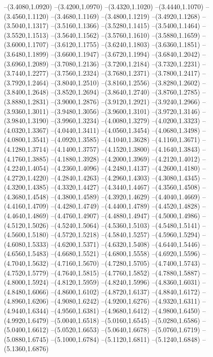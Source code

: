 {\begin{scope}
--(3.4080,1.0920)
--(3.4200,1.0970)
--(3.4320,1.1020)
--(3.4440,1.1070)
--(3.4560,1.1120)
--(3.4680,1.1169)
--(3.4800,1.1219)
--(3.4920,1.1268)
--(3.5040,1.1317)
--(3.5160,1.1366)
--(3.5280,1.1415)
--(3.5400,1.1464)
--(3.5520,1.1513)
--(3.5640,1.1562)
--(3.5760,1.1610)
--(3.5880,1.1659)
--(3.6000,1.1707)
--(3.6120,1.1755)
--(3.6240,1.1803)
--(3.6360,1.1851)
--(3.6480,1.1899)
--(3.6600,1.1947)
--(3.6720,1.1994)
--(3.6840,1.2042)
--(3.6960,1.2089)
--(3.7080,1.2136)
--(3.7200,1.2184)
--(3.7320,1.2231)
--(3.7440,1.2277)
--(3.7560,1.2324)
--(3.7680,1.2371)
--(3.7800,1.2417)
--(3.7920,1.2464)
--(3.8040,1.2510)
--(3.8160,1.2556)
--(3.8280,1.2602)
--(3.8400,1.2648)
--(3.8520,1.2694)
--(3.8640,1.2740)
--(3.8760,1.2785)
--(3.8880,1.2831)
--(3.9000,1.2876)
--(3.9120,1.2921)
--(3.9240,1.2966)
--(3.9360,1.3011)
--(3.9480,1.3056)
--(3.9600,1.3101)
--(3.9720,1.3146)
--(3.9840,1.3190)
--(3.9960,1.3234)
--(4.0080,1.3279)
--(4.0200,1.3323)
--(4.0320,1.3367)
--(4.0440,1.3411)
--(4.0560,1.3454)
--(4.0680,1.3498)
--(4.0800,1.3541)
--(4.0920,1.3585)
--(4.1040,1.3628)
--(4.1160,1.3671)
--(4.1280,1.3714)
--(4.1400,1.3757)
--(4.1520,1.3800)
--(4.1640,1.3843)
--(4.1760,1.3885)
--(4.1880,1.3928)
--(4.2000,1.3969)
--(4.2120,1.4012)
--(4.2240,1.4054)
--(4.2360,1.4096)
--(4.2480,1.4137)
--(4.2600,1.4180)
--(4.2720,1.4220)
--(4.2840,1.4263)
--(4.2960,1.4303)
--(4.3080,1.4345)
--(4.3200,1.4385)
--(4.3320,1.4427)
--(4.3440,1.4467)
--(4.3560,1.4508)
--(4.3680,1.4548)
--(4.3800,1.4589)
--(4.3920,1.4629)
--(4.4040,1.4669)
--(4.4160,1.4709)
--(4.4280,1.4749)
--(4.4400,1.4789)
--(4.4520,1.4828)
--(4.4640,1.4869)
--(4.4760,1.4907)
--(4.4880,1.4947)
--(4.5000,1.4986)
--(4.5120,1.5026)
--(4.5240,1.5064)
--(4.5360,1.5103)
--(4.5480,1.5141)
--(4.5600,1.5180)
--(4.5720,1.5218)
--(4.5840,1.5257)
--(4.5960,1.5294)
--(4.6080,1.5333)
--(4.6200,1.5371)
--(4.6320,1.5408)
--(4.6440,1.5446)
--(4.6560,1.5483)
--(4.6680,1.5521)
--(4.6800,1.5558)
--(4.6920,1.5596)
--(4.7040,1.5632)
--(4.7160,1.5670)
--(4.7280,1.5705)
--(4.7400,1.5743)
--(4.7520,1.5779)
--(4.7640,1.5815)
--(4.7760,1.5852)
--(4.7880,1.5887)
--(4.8000,1.5924)
--(4.8120,1.5959)
--(4.8240,1.5996)
--(4.8360,1.6031)
--(4.8480,1.6066)
--(4.8600,1.6102)
--(4.8720,1.6137)
--(4.8840,1.6172)
--(4.8960,1.6206)
--(4.9080,1.6242)
--(4.9200,1.6276)
--(4.9320,1.6311)
--(4.9440,1.6344)
--(4.9560,1.6381)
--(4.9680,1.6412)
--(4.9800,1.6450)
--(4.9920,1.6479)
--(5.0040,1.6518)
--(5.0160,1.6545)
--(5.0280,1.6586)
--(5.0400,1.6612)
--(5.0520,1.6653)
--(5.0640,1.6678)
--(5.0760,1.6719)
--(5.0880,1.6745)
--(5.1000,1.6784)
--(5.1120,1.6811)
--(5.1240,1.6848)
--(5.1360,1.6876)

\end{scope}}
